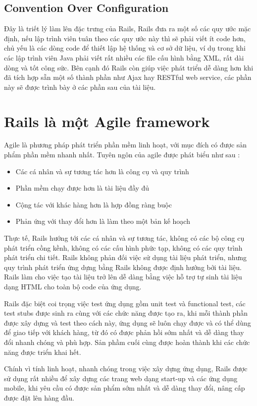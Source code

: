 \subsection{Convention Over Configuration}
Đây là triết lý làm lên đặc trưng của Rails, Rails đưa ra một số các quy ước mặc định, nếu lập trình viên tuân theo các quy ước này thì sẽ phải viết ít code hơn, chủ yếu là các dòng code để thiết lập hệ thống và cơ sở dữ liệu, ví dụ trong khi các lập trình viên Java phải viết rất nhiều các file cấu hình bằng XML, rất dài dòng và tốt công sức.
Bên cạnh đó Rails còn giúp việc phát triển dễ dàng hơn khi đã tích hợp sẵn một số thành phần như Ajax hay RESTful web service, các phần này sẽ được trình bày ở các phần sau của tài liệu.
\section{Rails là một Agile framework}
Agile là phương pháp phát triển phần mềm linh hoạt, với mục đích có được sản phẩm phần mềm nhanh nhất.
Tuyên ngôn của agile được phát biểu như sau :
\begin{itemize}
\item Các cá nhân và sự tương tác hơn là công cụ và quy trình
\item Phần mềm chạy được hơn là tài liệu đầy đủ
\item Cộng tác với khác hàng hơn là hợp đồng ràng buộc
\item Phản ứng với thay đổi hơn là làm theo một bản kế hoạch
\end{itemize}
Thực tế, Rails hướng tới các cá nhân và sự tương tác, không có các bộ công cụ phát triển cồng kềnh, không có các cấu hình phức tạp, không có các quy trình phát triển chi tiết. Rails không phản đối việc sử dụng tài liệu phát triển, nhưng quy trình phát triển ứng dựng bằng Rails không được định hướng bởi tài liệu. Rails làm cho việc tạo tài liệu trở lên dễ dàng bằng việc hỗ trợ tự sinh tài liệu dạng HTML cho toàn bộ code của ứng dụng. 

Rails đặc biệt coi trọng việc test ứng dụng gồm unit test và functional test, các test stubs được sinh ra cùng với các chức năng được tạo ra, khi mỗi thành phần được xây dựng và test theo cách này, ứng dụng sẽ luôn chạy được và có thể dùng để giao tiếp với khách hàng, từ đó có được phản hồi sớm nhất và dễ dàng thay đổi nhanh chóng và phù hợp. Sản phầm cuối cùng được hoàn thành khi các chức năng được triển khai hết. 

Chính vì tính linh hoạt, nhanh chóng trong việc xây dựng ứng dụng, Rails được sử dụng rất nhiều để xây dựng các trang web dạng start-up và các ứng dụng mobile, khi yêu cầu có được sản phẩm sớm nhất và dễ dàng thay đổi, nâng cấp được đặt lên hàng đầu. \newline


